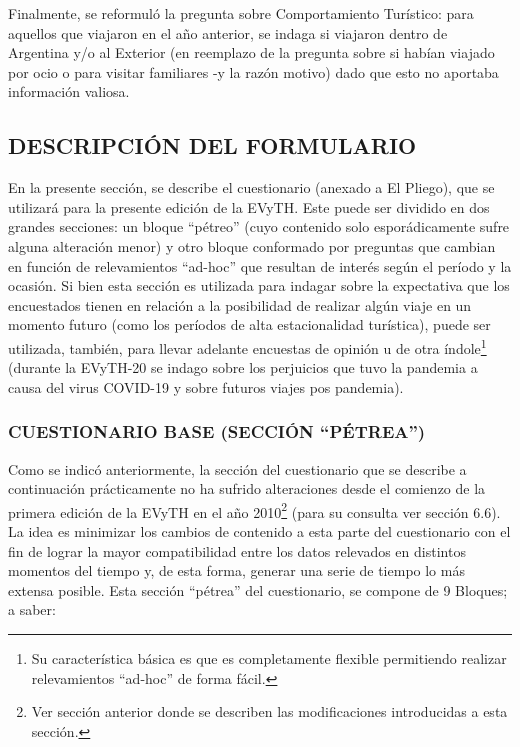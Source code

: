 \documentclass[
  openany]{book}
\begin{document}
Finalmente, se reformuló la pregunta sobre Comportamiento Turístico: para aquellos que viajaron en el año anterior, se indaga si viajaron dentro de Argentina y/o al Exterior (en reemplazo de la pregunta sobre si habían viajado por ocio o para visitar familiares -y la razón motivo) dado que esto no aportaba información valiosa.

\hypertarget{descripciuxf3n-del-formulario}{%
\subsection{\texorpdfstring{\textbf{DESCRIPCIÓN DEL FORMULARIO}}{DESCRIPCIÓN DEL FORMULARIO}}\label{descripciuxf3n-del-formulario}}

En la presente sección, se describe el cuestionario (anexado a El Pliego), que se utilizará para la presente edición de la EVyTH.
Este puede ser dividido en dos grandes secciones: un bloque ``pétreo'' (cuyo contenido solo esporádicamente sufre alguna alteración menor) y otro bloque conformado por preguntas que cambian en función de relevamientos ``ad-hoc'' que resultan de interés según el período y la ocasión.
Si bien esta sección es utilizada para indagar sobre la expectativa que los encuestados tienen en relación a la posibilidad de realizar algún viaje en un momento futuro (como los períodos de alta estacionalidad turística), puede ser utilizada, también, para llevar adelante encuestas de opinión u de otra índole\footnote{Su característica básica es que es completamente flexible permitiendo realizar relevamientos ``ad-hoc'' de forma fácil.} (durante la EVyTH-20 se indago sobre los perjuicios que tuvo la pandemia a causa del virus COVID-19 y sobre futuros viajes pos pandemia).

\hypertarget{cuestionario-base-secciuxf3n-puxe9trea}{%
\subsubsection{\texorpdfstring{\textbf{CUESTIONARIO BASE (SECCIÓN ``PÉTREA'')}}{CUESTIONARIO BASE (SECCIÓN ``PÉTREA'')}}\label{cuestionario-base-secciuxf3n-puxe9trea}}

Como se indicó anteriormente, la sección del cuestionario que se describe a continuación prácticamente no ha sufrido alteraciones desde el comienzo de la primera edición de la EVyTH en el año 2010\footnote{Ver sección anterior donde se describen las modificaciones introducidas a esta sección.} (para su consulta ver sección 6.6).
La idea es minimizar los cambios de contenido a esta parte del cuestionario con el fin de lograr la mayor compatibilidad entre los datos relevados en distintos momentos del tiempo y, de esta forma, generar una serie de tiempo lo más extensa posible.
Esta sección ``pétrea'' del cuestionario, se compone de 9 Bloques; a saber:
\end{document}
